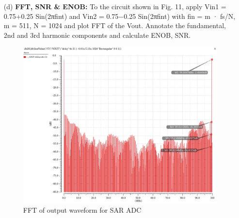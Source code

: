\documentclass[a4paper,12pt]{article}
\begin{document}
\begin{itemize}
    \item[(d)] \textbf{FFT, SNR & ENOB:}
    To the circuit shown in Fig. 11, apply Vin1 = 0.75+0.25 Sin(2πfint) and Vin2 = 0.75−0.25 Sin(2πfint) with fin = m · fs/N, m = 511, N = 1024 and plot FFT of the Vout. Annotate the fundamental, 2nd and 3rd harmonic components and calculate ENOB, SNR.
    \begin{figure}[H]
        \centering
        \includegraphics[max width = \textwidth]{3/3_FFT.png}
        \caption{FFT of output waveform for SAR ADC}
        \label{fig:enter-label}
    \end{figure}


\end{itemize}
\end{document}
